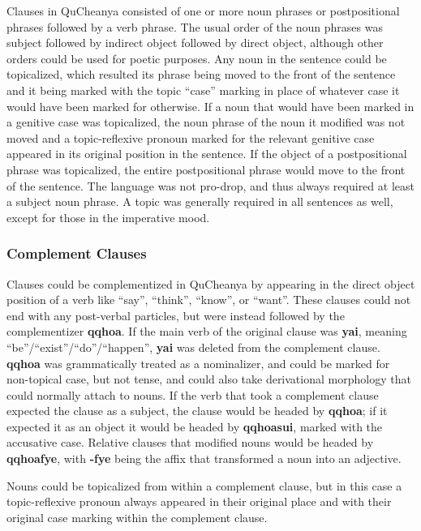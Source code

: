 \documentclass{article}
\begin{document}
Clauses in QuCheanya consisted of one or more noun phrases or postpositional phrases followed by a verb phrase.  The usual order of the noun phrases was subject followed by indirect object followed by direct object, although other orders could be used for poetic purposes.  Any noun in the sentence could be topicalized, which resulted its phrase being moved to the front of the sentence and it being marked with the topic ``case'' marking in place of whatever case it would have been marked for otherwise.  If a noun that would have been marked in a genitive case was topicalized, the noun phrase of the noun it modified was not moved and a topic-reflexive pronoun marked for the relevant genitive case appeared in its original position in the sentence.  If the object of a postpositional phrase was topicalized, the entire postpositional phrase would move to the front of the sentence.  The language was not pro-drop, and thus always required at least a subject noun phrase.  A topic was generally required in all sentences as well, except for those in the imperative mood.

\subsubsection{Complement Clauses}

Clauses could be complementized in QuCheanya by appearing in the direct object position of a verb like ``say'', ``think'', ``know'', or ``want''.  These clauses could not end with any post-verbal particles, but were instead followed by the complementizer \textbf{qqhoa}.  If the main verb of the original clause was \textbf{yai}, meaning ``be''/``exist''/``do''/``happen'', \textbf{yai} was deleted from the complement clause. \textbf{qqhoa} was grammatically treated as a nominalizer, and could be marked for non-topical case, but not tense, and could also take derivational morphology that could normally attach to nouns.  If the verb that took a complement clause expected the clause as a subject, the clause would be headed by \textbf{qqhoa}; if it expected it as an object it would be headed by \textbf{qqhoasui}, marked with the accusative case.  Relative clauses that modified nouns would be headed by \textbf{qqhoafye}, with \textbf{-fye} being the affix that transformed a noun into an adjective.

Nouns could be topicalized from within a complement clause, but in this case a topic-reflexive pronoun always appeared in their original place and with their original case marking within the complement clause.
\end{document}
